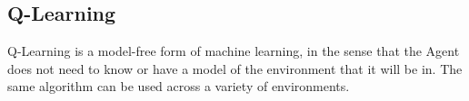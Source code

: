 \subsection{Q-Learning}
Q-Learning is a model-free form of machine learning, in the sense that the Agent does not need to know or have a model of the environment that it will be in. The same algorithm can be used across a variety of environments.






